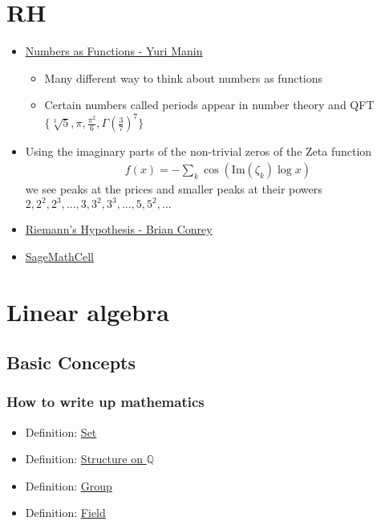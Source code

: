 \documentclass[../main.tex]{subfiles}
\begin{document}
\section{RH}
\begin{itemize}
\item  \href{https://arxiv.org/pdf/1312.5160.pdf}{Numbers as Functions - Yuri Manin}
\begin{itemize}
\item Many different way to think about numbers as functions
\item Certain numbers called periods appear in number  theory and QFT $\{\sqrt[3]{5},\pi,\frac{\pi^2}{6},\Gamma\left(\frac{3}{7}\right)^7\}$
\end{itemize}

\item Using the imaginary parts of the non-trivial zeros of the Zeta function
\begin{align}
f(x)=-\sum_{k}\cos(\text{Im}(\zeta_k)\log x)
\end{align}
we see peaks at the prices and smaller peaks at their powers ${2,2^2,2^3,...,3,3^2,3^3,...,5,5^2,...}$

\item \href{https://tinyurl.com/conrey90}{Riemann's Hypothesis - Brian Conrey}

\item \href{https://sagecell.sagemath.org/}{SageMathCell}
\end{itemize}

\section{Linear algebra}
\setcounter{subsection}{-1}
\subsection{Basic Concepts}
\subsubsection{How to write up mathematics}
\begin{itemize}
\item[] {\sc Definition}: \underline{Set}

\item[] {\sc Definition}: \underline{Structure on $\mathbb{Q}$}

\item[] {\sc Definition}: \underline{Group}

\item[] {\sc Definition}: \underline{Field}
\end{itemize}
\end{document}
